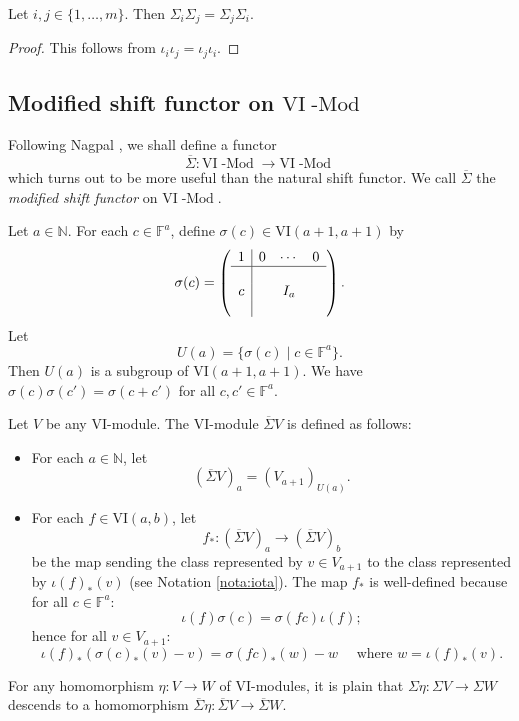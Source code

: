\documentclass{amsart}
\numberwithin{equation}{section}
\DeclareMathOperator{\Mod}{-Mod}
\newcommand{\N}{{\mathbb{N}}}
\newcommand{\F}{{\mathbb{F}}}
\newcommand{\VI}{{\mathrm{VI}}}
\newcommand{\SSigma}{{\overline{\Sigma}}}
\begin{document}
\begin{lemma} \label{lem:natural shifts commute}
   Let $i,j\in \{1,\ldots, m\}$. Then $\Sigma_i \Sigma_j = \Sigma_j \Sigma_i$.
\end{lemma}

\begin{proof}
   This follows from $\iota_i \iota_j = \iota_j \iota_i$.
\end{proof}

\subsection{Modified shift functor on $\VI\Mod$}
Following Nagpal \cite{na}, we shall define a functor 
\[ \overline{\Sigma}: \VI\Mod \to \VI\Mod \]
which turns out to be more useful than the natural shift functor. We call $\overline{\Sigma}$ the \emph{modified shift functor} on $\VI\Mod$. 

Let $a\in \N$. For each $c\in \F^a$, define $\sigma(c)\in \VI(a+1, a+1)$ by 
\[ \sigma(c) = \left( \begin{array}{c|ccc} 
   1 & 0 & \cdots & 0 \\
   \hline
    &   &        &   \\
   c & & I_a &   \\
    &   &        &  
   \end{array} \right). \]
Let 
\[ U(a)=\{\sigma(c) \mid c\in \F^a\}. \]  
Then $U(a)$ is a subgroup of $\VI(a+1, a+1)$. We have $\sigma(c) \sigma(c')=\sigma(c+c')$ for all $c,c'\in \F^a$.

Let $V$ be any $\VI$-module. The $\VI$-module $\SSigma V$ is defined as follows:
\begin{itemize}
   \item For each $a\in \N$, let
   \[ (\SSigma V)_a = (V_{a+1})_{U(a)}. \]
   \item For each $f\in \VI(a,b)$, let  
   \[ f_* : (\SSigma V)_a \to (\SSigma V)_b \]
   be the map sending the class represented by $v\in V_{a+1}$ to the class represented by $\iota(f)_*(v)$ (see Notation \ref{nota:iota}). The map $f_*$ is well-defined because for all $c\in \F^a$:   
   \[ \iota(f)\sigma(c) = \sigma(fc)\iota(f); \]
   hence for all $v\in V_{a+1}$:
   \[ \iota(f)_*(\sigma(c)_*(v) - v) =  \sigma(fc)_*(w) - w \quad \mbox{ where } w= \iota(f)_*(v). \]
\end{itemize} 

For any homomorphism $\eta:V\to W$ of $\VI$-modules, it is plain that $\Sigma\eta: \Sigma V \to \Sigma W$ descends to a homomorphism $\SSigma \eta: \SSigma V\to \SSigma W$.
\end{document}
